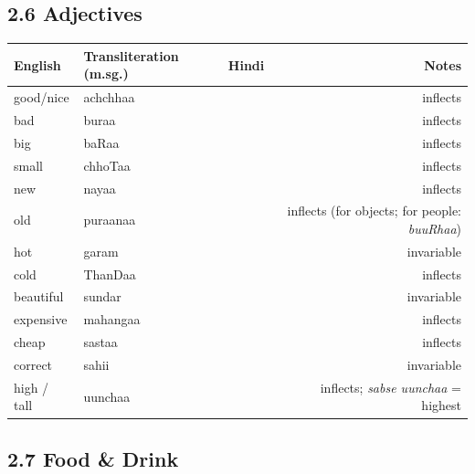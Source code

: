 \subsection{2.6 Adjectives}

\begin{tabular}{@{}VTDN@{}}
  \toprule
  English & Transliteration (m.sg.) & Hindi & Notes \\
  \midrule
  good/nice   & achchhaa   &    & inflects \\
  bad         & buraa    &     & inflects \\
  big         & baRaa   &     & inflects \\
  small       & chhoTaa  &     & inflects \\
  new         & nayaa    &      & inflects \\
  old         & puraanaa &   & inflects (for objects; for people: \textit{buuRhaa}) \\
  hot         & garam    &      & invariable \\
  cold        & ThanDaa &    & inflects \\
  beautiful   & sundar   &    & invariable \\
  expensive   & mahangaa &   & inflects \\
  cheap       & sastaa  &    & inflects \\
  correct     & sahii     &     & invariable \\
  high / tall & uunchaa   &    & inflects; \textit{sabse uunchaa} = highest \\
  \bottomrule
\end{tabular}

\subsection{2.7 Food \& Drink}

